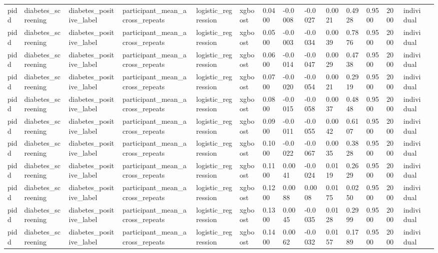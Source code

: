 \begin{tabular}{lllllllllllllll}
pidd & diabetes\_screening & diabetes\_positive\_label & participant\_mean\_across\_repeats & logistic\_regression & xgboost & 0.0400 & -0.0008 & -0.0027 & 0.0021 & 0.4928 & 0.9500 & 2000 & individual &  \\
pidd & diabetes\_screening & diabetes\_positive\_label & participant\_mean\_across\_repeats & logistic\_regression & xgboost & 0.0500 & -0.0003 & -0.0034 & 0.0039 & 0.7876 & 0.9500 & 2000 & individual &  \\
pidd & diabetes\_screening & diabetes\_positive\_label & participant\_mean\_across\_repeats & logistic\_regression & xgboost & 0.0600 & -0.0014 & -0.0047 & 0.0029 & 0.4738 & 0.9500 & 2000 & individual &  \\
pidd & diabetes\_screening & diabetes\_positive\_label & participant\_mean\_across\_repeats & logistic\_regression & xgboost & 0.0700 & -0.0020 & -0.0054 & 0.0021 & 0.2919 & 0.9500 & 2000 & individual &  \\
pidd & diabetes\_screening & diabetes\_positive\_label & participant\_mean\_across\_repeats & logistic\_regression & xgboost & 0.0800 & -0.0015 & -0.0058 & 0.0037 & 0.4848 & 0.9500 & 2000 & individual &  \\
pidd & diabetes\_screening & diabetes\_positive\_label & participant\_mean\_across\_repeats & logistic\_regression & xgboost & 0.0900 & -0.0011 & -0.0055 & 0.0042 & 0.6107 & 0.9500 & 2000 & individual &  \\
pidd & diabetes\_screening & diabetes\_positive\_label & participant\_mean\_across\_repeats & logistic\_regression & xgboost & 0.1000 & -0.0022 & -0.0067 & 0.0035 & 0.3828 & 0.9500 & 2000 & individual &  \\
pidd & diabetes\_screening & diabetes\_positive\_label & participant\_mean\_across\_repeats & logistic\_regression & xgboost & 0.1100 & 0.0041 & -0.0024 & 0.0119 & 0.2629 & 0.9500 & 2000 & individual &  \\
pidd & diabetes\_screening & diabetes\_positive\_label & participant\_mean\_across\_repeats & logistic\_regression & xgboost & 0.1200 & 0.0088 & 0.0008 & 0.0175 & 0.0250 & 0.9500 & 2000 & individual &  \\
pidd & diabetes\_screening & diabetes\_positive\_label & participant\_mean\_across\_repeats & logistic\_regression & xgboost & 0.1300 & 0.0045 & -0.0035 & 0.0128 & 0.2999 & 0.9500 & 2000 & individual &  \\
pidd & diabetes\_screening & diabetes\_positive\_label & participant\_mean\_across\_repeats & logistic\_regression & xgboost & 0.1400 & 0.0062 & -0.0032 & 0.0157 & 0.1789 & 0.9500 & 2000 & individual &  \\

\end{tabular}
